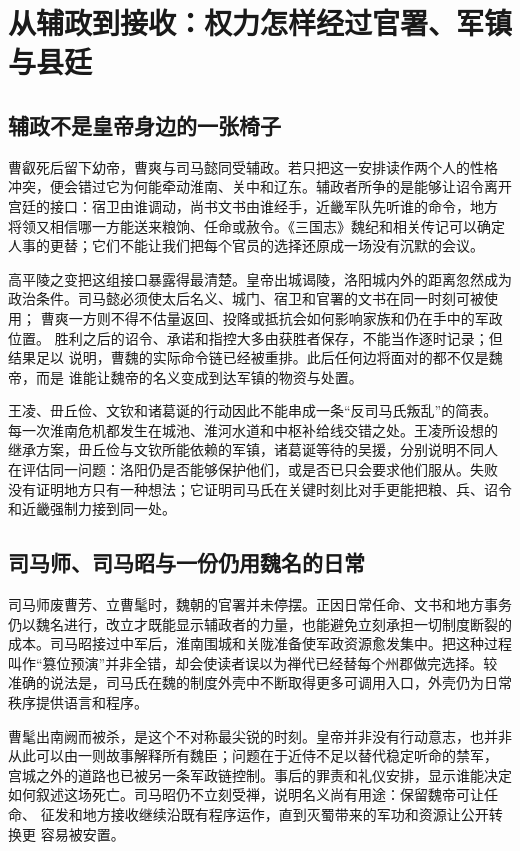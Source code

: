 \section{从辅政到接收：权力怎样经过官署、军镇与县廷}

\subsection{辅政不是皇帝身边的一张椅子}

曹叡死后留下幼帝，曹爽与司马懿同受辅政。若只把这一安排读作两个人的性格
冲突，便会错过它为何能牵动淮南、关中和辽东。辅政者所争的是能够让诏令离开
宫廷的接口：宿卫由谁调动，尚书文书由谁经手，近畿军队先听谁的命令，地方
将领又相信哪一方能送来粮饷、任命或赦令。《三国志》魏纪和相关传记可以确定
人事的更替；它们不能让我们把每个官员的选择还原成一场没有沉默的会议。

高平陵之变把这组接口暴露得最清楚。皇帝出城谒陵，洛阳城内外的距离忽然成为
政治条件。司马懿必须使太后名义、城门、宿卫和官署的文书在同一时刻可被使用；
曹爽一方则不得不估量返回、投降或抵抗会如何影响家族和仍在手中的军政位置。
胜利之后的诏令、承诺和指控大多由获胜者保存，不能当作逐时记录；但结果足以
说明，曹魏的实际命令链已经被重排。此后任何边将面对的都不仅是魏帝，而是
谁能让魏帝的名义变成到达军镇的物资与处置。

王凌、毌丘俭、文钦和诸葛诞的行动因此不能串成一条“反司马氏叛乱”的简表。
每一次淮南危机都发生在城池、淮河水道和中枢补给线交错之处。王凌所设想的
继承方案，毌丘俭与文钦所能依赖的军镇，诸葛诞等待的吴援，分别说明不同人
在评估同一问题：洛阳仍是否能够保护他们，或是否已只会要求他们服从。失败
没有证明地方只有一种想法；它证明司马氏在关键时刻比对手更能把粮、兵、诏令
和近畿强制力接到同一处。

\subsection{司马师、司马昭与一份仍用魏名的日常}

司马师废曹芳、立曹髦时，魏朝的官署并未停摆。正因日常任命、文书和地方事务
仍以魏名进行，改立才既能显示辅政者的力量，也能避免立刻承担一切制度断裂的
成本。司马昭接过中军后，淮南围城和关陇准备使军政资源愈发集中。把这种过程
叫作“篡位预演”并非全错，却会使读者误以为禅代已经替每个州郡做完选择。较
准确的说法是，司马氏在魏的制度外壳中不断取得更多可调用入口，外壳仍为日常
秩序提供语言和程序。

曹髦出南阙而被杀，是这个不对称最尖锐的时刻。皇帝并非没有行动意志，也并非
从此可以由一则故事解释所有魏臣；问题在于近侍不足以替代稳定听命的禁军，
宫城之外的道路也已被另一条军政链控制。事后的罪责和礼仪安排，显示谁能决定
如何叙述这场死亡。司马昭仍不立刻受禅，说明名义尚有用途：保留魏帝可让任命、
征发和地方接收继续沿既有程序运作，直到灭蜀带来的军功和资源让公开转换更
容易被安置。

